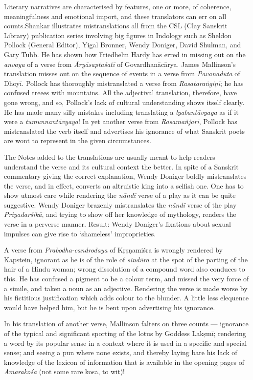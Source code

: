 Literary narratives are characterised by features, one or more, of coherence, meaningfulness and emotional import, and these translators can err on all counts.Shankar illustrates mistranslations all from the CSL (Clay Sanskrit Library) publication series involving big figures in Indology such as Sheldon Pollock (General Editor), Yigal Bronner, Wendy Doniger, David Shulman, and Gary Tubb. He has shown how Friedhelm Hardy has erred in missing out on the \textsl{anvaya} of a verse from \textsl{Āryāsaptaśatī} of Govardhanācārya. James Mallinson’s translation misses out on the sequence of events in a verse from \textsl{Pavanadūta} of Dhoyī. Pollock has thoroughly mistranslated a verse from \textsl{Rasataraṅgiṇī}; he has confused treees with mountains. All the adjectival translation, therefore, have gone wrong, and so, Pollock’s lack of cultural understanding shows itself clearly. He has made many silly mistakes including translating a \textsl{lyabantāvyaya} as if it were a \textsl{tumunnantāvyaya}! In yet another verse from \textsl{Rasamañjarī}, Pollock has mistranslated the verb itself and advertises his ignorance of what Sanskrit poets are wont to represent in the given circumstances.

The Notes added to the translations are usually meant to help readers understand the verse and its cultural context the better. In spite of a Sanskrit commentary giving the correct explanation, Wendy Doniger boldly mistranslates the verse, and in effect, converts an altruistic king into a selfish one. One has to show utmost care while rendering the \textsl{nāndī} verse of a play as it can be quite suggestive. Wendy Doniger brazenly mistranslates the \textsl{nāndī} verse of the play \textsl{Priyadarśikā}, and trying to show off her knowledge of mythology, renders the verse in a perverse manner. Result: Wendy Doniger’s fixations about sexual impulses can give rise to ‘shameless’ improprieties.

A verse from \textsl{Prabodha-candrodaya} of Kṛṣṇamiśra is wrongly rendered by Kapstein, ignorant as he is of the role of \textsl{sindūra} at the spot of the parting of the hair of a Hindu woman; wrong dissolution of a compound word also conduces to this. He has confused a pigment to be a colour term, and missed the very force of a simile, and taken a noun as an adjective. Rendering the verse is made worse by his fictitious justification which adds colour to the blunder. A little less elequence would have helped him, but he is bent upon advertising his ignorance.

In his translation of another verse, Mallinson falters on three counts --- ignorance of the typical and significant sporting of the lotus by Goddess Lakṣmī; rendering a word by its popular sense in a context where it is used in a specific and special sense; and seeing a pun where none exists, and thereby laying bare his lack of knowledge of the lexicon of information that is available in the opening pages of \textsl{Amarakośa} (not some rare kosa, to wit)!

